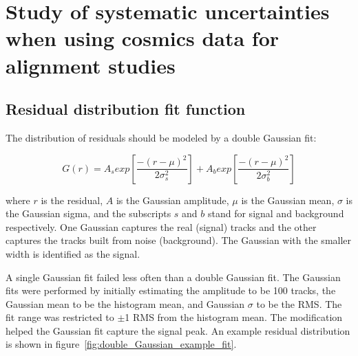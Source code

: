 

\chapter[Analysis systematics]{Study of systematic uncertainties when using cosmics data for alignment studies}
\label{appendix:systematics}


\section{Residual distribution fit function}
\label{appendix:systematics_res_fit_fcn}


The distribution of residuals should be modeled by a double Gaussian fit\cite{lefebvre_thesis}:

\begin{equation}
\label{eqn:doub_gaus}
G(r) = A_{s}exp\left[ \frac{-(r-\mu)^{2}}{2\sigma_s^{2}} \right] + A_{b}exp\left[ \frac{-(r-\mu)^{2}}{2\sigma_b^{2}} \right]
\end{equation}

where $r$ is the residual, $A$ is the Gaussian amplitude, $\mu$ is the Gaussian mean, $\sigma$ is the Gaussian sigma, and the subscripts $s$ and $b$ stand for signal and background respectively. One Gaussian captures the real (signal) tracks and the other captures the tracks built from noise (background). The Gaussian with the smaller width is identified as the signal. 

A single Gaussian fit failed less often than a double Gaussian fit. The Gaussian fits were performed by initially estimating the amplitude to be 100 tracks, the Gaussian mean to be the histogram mean, and Gaussian $\sigma$ to be the RMS. The fit range was restricted to $\pm$1 RMS from the histogram mean. The modification helped the Gaussian fit capture the signal peak. An example residual distribution is shown in figure~\ref{fig:double_Gaussian_example_fit}. 

